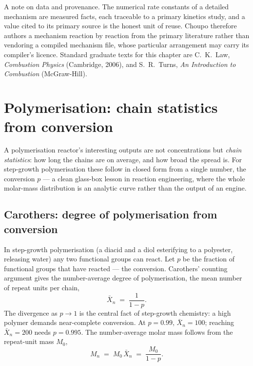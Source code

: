 \documentclass[11pt,a4paper]{article}
\begin{document}
A note on data and provenance.  The numerical rate constants of a
detailed mechanism are measured facts, each traceable to a primary
kinetics study, and a value cited to its primary source is the honest
unit of reuse.  Choupo therefore authors a mechanism reaction by
reaction from the primary literature rather than vendoring a compiled
mechanism file, whose particular arrangement may carry its compiler's
licence.  Standard graduate texts for this chapter are C.~K.~Law,
\emph{Combustion Physics} (Cambridge, 2006), and S.~R.~Turns,
\emph{An Introduction to Combustion} (McGraw-Hill).

\section{Polymerisation: chain statistics from conversion}\label{ch:polymers}

\begin{whatyoulllearn}
A polymerisation reactor's interesting outputs are not concentrations
but \emph{chain statistics}: how long the chains are on average, and
how broad the spread is.  For step-growth polymerisation these follow
in closed form from a single number, the conversion $p$ --- a clean
glass-box lesson in reaction engineering, where the whole molar-mass
distribution is an analytic curve rather than the output of an engine.
\end{whatyoulllearn}

\subsection{Carothers: degree of polymerisation from conversion}

In step-growth polymerisation (a diacid and a diol esterifying to a
polyester, releasing water) any two functional groups can react.  Let
$p$ be the fraction of functional groups that have reacted --- the
conversion.  Carothers' counting argument gives the number-average
degree of polymerisation, the mean number of repeat units per chain,
\begin{equation}
    \bar X_n \;=\; \frac{1}{1-p}.
    \label{eq:carothers}
\end{equation}
The divergence as $p\to 1$ is the central fact of step-growth
chemistry: a high polymer demands near-complete conversion.  At
$p = 0.99$, $\bar X_n = 100$; reaching $\bar X_n = 200$ needs
$p = 0.995$.  The number-average molar mass follows from the
repeat-unit mass $M_0$,
\begin{equation}
    M_n \;=\; M_0\,\bar X_n \;=\; \frac{M_0}{1-p}.
    \label{eq:Mn}
\end{equation}
\end{document}
